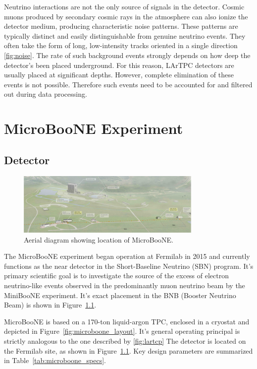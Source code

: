 \documentclass{pracalicmgr}
\begin{document}
Neutrino interactions are not the only source of signals in the detector. Cosmic muons produced by secondary cosmic rays in the atmosphere can also ionize the detector medium, producing characteristic noise patterns. These patterns are typically distinct and easily distinguishable from genuine neutrino events. They often take the form of long, low-intensity tracks oriented in a single direction \ref{fig:noise}. The rate of such background events strongly depends on how deep the detector's been placed underground. For this reason, LArTPC detectors are usually placed at significant depths. However, complete elimination of these events is not possible. Therefore such events need to be accounted for and filtered out during data processing.

\chapter{MicroBooNE Experiment}

\section{Detector}

\begin{figure}[H]
    \centering
    \includegraphics[width=0.80\textwidth]{src/microbooneBirdseyes.pdf}
    \caption{Aerial diagram showing location of MicroBooNE.}
    \label{fig:microboone_birdseye}
\end{figure}

The MicroBooNE experiment began operation at Fermilab in 2015 and currently functions as the near detector in the Short-Baseline Neutrino (SBN) program. It's primary scientific goal  is to investigate the source of the excess of electron neutrino-like events observed in the predominantly muon neutrino beam by the MiniBooNE experiment. It's exact placement in the BNB (Booster Neutrino Beam) is shown in Figure~\ref{fig:microboone_birdseye}.

MicroBooNE is based on a 170-ton liquid-argon TPC, enclosed in a cryostat and depicted in Figure~\ref{fig:microboone_layout}. It's general operating principal is strictly analogous to the one described by \ref{fig:lartcp} The detector is located on the Fermilab site, as shown in Figure~\ref{fig:microboone_birdseye}. Key design parameters are summarized in Table~\ref{tab:microboone_specs}.
\end{document}
